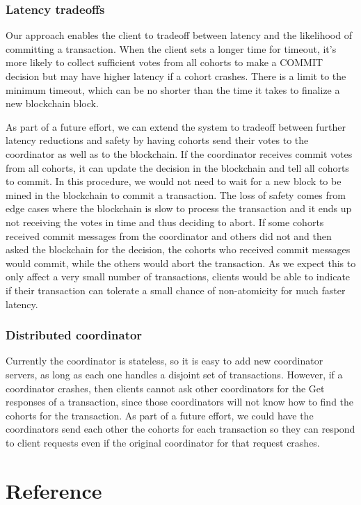 \documentclass[11pt,conference]{IEEEtran}
\begin{document}
\subsubsection{Latency tradeoffs}
Our approach enables the client to tradeoff between latency and the likelihood of committing a transaction. When the client sets a longer time for timeout, it’s more likely to collect sufficient votes from all cohorts to make a COMMIT decision but may have higher latency if a cohort crashes. There is a limit to the minimum timeout, which can be no shorter than the time it takes to finalize a new blockchain block.

As part of a future effort, we can extend the system to tradeoff between further latency reductions and safety by having cohorts send their votes to the coordinator as well as to the blockchain. If the coordinator receives commit votes from all cohorts, it can update the decision in the blockchain and tell all cohorts to commit. In this procedure, we would not need to wait for a new block to be mined in the blockchain to commit a transaction. The loss of safety comes from edge cases where the blockchain is slow to process the transaction and it ends up not receiving the votes in time and thus deciding to abort. If some cohorts received commit messages from the coordinator and others did not and then asked the blockchain for the decision, the cohorts who received commit messages would commit, while the others would abort the transaction. As we expect this to only affect a very small number of transactions, clients would be able to indicate if their transaction can tolerate a small chance of non-atomicity for much faster latency.

\subsubsection{Distributed coordinator}
Currently the coordinator is stateless, so it is easy to add new coordinator servers, as long as each one handles a disjoint set of transactions. However, if a coordinator crashes, then clients cannot ask other coordinators for the Get responses of a transaction, since those coordinators will not know how to find the cohorts for the transaction. As part of a future effort, we could have the coordinators send each other the cohorts for each transaction so they can respond to client requests even if the original coordinator for that request crashes.

\section{Reference}
\end{document}
